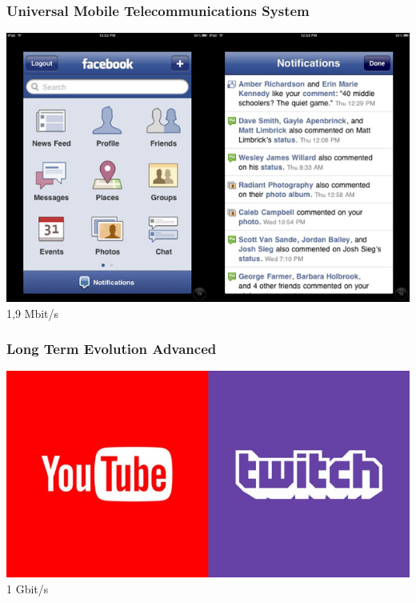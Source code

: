 \documentclass{beamer}
\begin{document}
    \begin{frame}
        \frametitle{Universal Mobile Telecommunications System}
        \includegraphics[width=\linewidth,height=0.9\textheight]{img/facebook.jpg}
        1,9 Mbit/s
    \end{frame}

    \begin{frame}
        \frametitle{Long Term Evolution Advanced}
        \includegraphics[width=\linewidth,height=0.9\textheight]{img/fb-tw.jpg}
        1 Gbit/s
    \end{frame}
\end{document}
